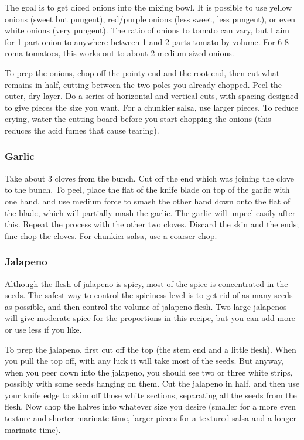 The goal is to get diced onions into the mixing bowl. It is possible to use yellow onions (sweet but pungent), red/purple onions (less sweet, less pungent), or even white onions (very pungent). The ratio of onions to tomato can vary, but I aim for 1 part onion to anywhere between 1 and 2 parts tomato by volume. For 6-8 roma tomatoes, this works out to about 2 medium-sized onions.

To prep the onions, chop off the pointy end and the root end, then cut what remains in half, cutting between the two poles you already chopped. Peel the outer, dry layer. Do a series of horizontal and vertical cuts, with spacing designed to give pieces the size you want. For a chunkier salsa, use larger pieces. To reduce crying, water the cutting board before you start chopping the onions (this reduces the acid fumes that cause tearing).

\subsubsection{Garlic}

Take about 3 cloves from the bunch. Cut off the end which was joining the clove to the bunch. To peel, place the flat of the knife blade on top of the garlic with one hand, and use medium force to smash the other hand down onto the flat of the blade, which will partially mash the garlic. The garlic will unpeel easily after this. Repeat the process with the other two cloves. Discard the skin and the ends; fine-chop the cloves. For chunkier salsa, use a coarser chop.

\subsubsection{Jalapeno}

Although the flesh of jalapeno is spicy, most of the spice is concentrated in the seeds. The safest way to control the spiciness level is to get rid of as many seeds as possible, and then control the volume of jalapeno flesh. Two large jalapenos will give moderate spice for the proportions in this recipe, but you can add more or use less if you like.

To prep the jalapeno, first cut off the top (the stem end and a little flesh). When you pull the top off, with any luck it will take most of the seeds. But anyway, when you peer down into the jalapeno, you should see two or three white strips, possibly with some seeds hanging on them. Cut the jalapeno in half, and then use your knife edge to skim off those white sections, separating all the seeds from the flesh. Now chop the halves into whatever size you desire (smaller for a more even texture and shorter marinate time, larger pieces for a textured salsa and a longer marinate time).

